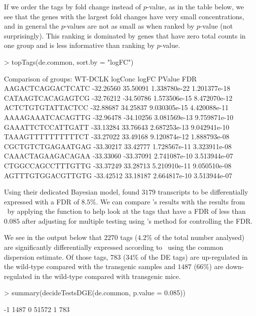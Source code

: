 If we order the tags by fold change instead of $p$-value, as in the
table below, we see that the genes with the largest fold changes have
very small concentrations, and in general the $p$-values are not as
small as when ranked by $p$-value (not surprisingly). This ranking is
dominated by genes that have zero total counts in one group and is
less informative than ranking by $p$-value.

\begin{Schunk}
\begin{Sinput}
> topTags(de.common, sort.by = "logFC")
\end{Sinput}
\begin{Soutput}
Comparison of groups: WT-DCLK 
                    logConc     logFC       PValue          FDR
AAGACTCAGGACTCATC -32.26560  35.50091 1.338780e-22 1.201377e-18
CATAAGTCACAGAGTCG -32.76212 -34.50786 1.573506e-15 8.472070e-12
ACTCTGTGTATTACTCC -32.88687  34.25837 9.030305e-15 4.420088e-11
AAAAGAAATCACAGTTG -32.96478 -34.10256 3.081569e-13 9.759871e-10
GAAATTCTCCATTGATT -33.13284  33.76643 2.687253e-13 9.042941e-10
TAAAGTTTTTTTTTTCT -33.27022  33.49168 9.120874e-12 1.888793e-08
CGCTGTCTGAGAATGAG -33.30217  33.42777 1.728567e-11 3.323911e-08
CAAACTAGAAGACAGAA -33.33060 -33.37091 2.741087e-10 3.513944e-07
CTGGCCAGCCTTTGTTG -33.37249  33.28713 5.210910e-11 9.050510e-08
AGTTTGTGGACGTTGTG -33.42512  33.18187 2.664817e-10 3.513944e-07
\end{Soutput}
\end{Schunk}

Using their dedicated Bayesian model, \citet{THoen:2008p9} found
$3179$ transcripts to be differentially expressed with a FDR of
$8.5$\%. We can compare \citet{THoen:2008p9}'s results with the
results from \edgeR~by applying the  function to help
look at the tags that have a FDR of less than $0.085$ after adjusting
for multiple testing using \citet{Benjamini95}'s method for
controlling the FDR.

We see in the output below that $2270$ tags ($4.2$\% of the total
number analysed) are significantly differentially expressed according
to \edgeR~using the common dispersion estimate. Of those tags, $783$
($34$\% of the DE tags) are up-regulated in the wild-type compared
with the transgenic samples and $1487$ ($66$\%) are down-regulated in
the wild-type compared with transgenic mice.

\begin{Schunk}
\begin{Sinput}
> summary(decideTestsDGE(de.common, p.value = 0.085))
\end{Sinput}
\begin{Soutput}
   [,1] 
-1  1487
0  51572
1    783
\end{Soutput}
\end{Schunk}

